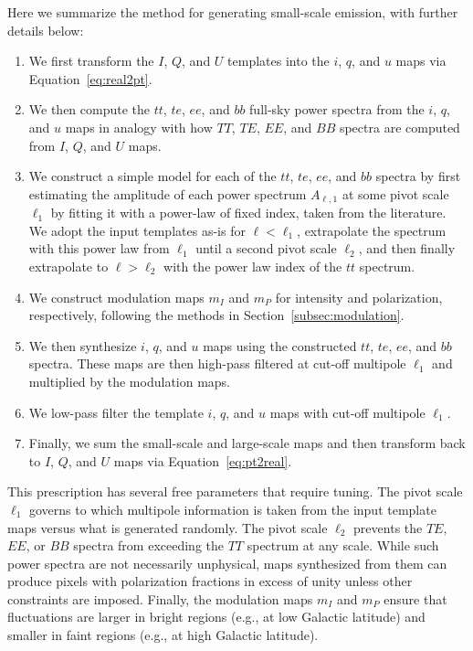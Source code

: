 Here we summarize the method for generating small-scale emission, with further details below: 
\begin{enumerate}
    \item We first transform the $I$, $Q$, and $U$ templates into the $i$, $q$, and $u$ maps via Equation~\eqref{eq:real2pt}. 
    \item We then compute the $tt$, $te$, $ee$, and $bb$ full-sky power spectra from the $i$, $q$, and $u$ maps in analogy with how $TT$, $TE$, $EE$, and $BB$ spectra are computed from $I$, $Q$, and $U$ maps.
    \item We construct a simple model for each of the $tt$, $te$, $ee$, and $bb$ spectra by first estimating the amplitude of each power spectrum $A_{\ell, 1}$ at some pivot scale $\ell_1$ by fitting it with a power-law of fixed index, taken from the literature. We adopt the input templates as-is for $\ell < \ell_1$, extrapolate the spectrum with this power law from $\ell_1$ until a second pivot scale $\ell_2$, and then finally extrapolate to $\ell > \ell_2$ with the power law index of the $tt$ spectrum.
    \item We construct modulation maps $m_I$ and $m_P$ for intensity and polarization, respectively, following the methods in Section~\ref{subsec:modulation}.
    \item We then synthesize $i$, $q$, and $u$ maps using the constructed $tt$, $te$, $ee$, and $bb$ spectra. These maps are then high-pass filtered at cut-off multipole $\ell_1$ and multiplied by the modulation maps. 
    \item We low-pass filter the template $i$, $q$, and $u$ maps with cut-off multipole $\ell_1$. 
    \item Finally, we sum the small-scale and large-scale maps and then transform back to $I$, $Q$, and $U$ maps via Equation~\eqref{eq:pt2real}. 
\end{enumerate}

This prescription has several free parameters that require tuning. The pivot scale $\ell_1$ governs to which multipole information is taken from the input template maps versus what is generated randomly. The pivot scale $\ell_2$ prevents the $TE$, $EE$, or $BB$ spectra from exceeding the $TT$ spectrum at any scale. While such power spectra are not necessarily unphysical, maps synthesized from them can produce pixels with polarization fractions in excess of unity unless other constraints are imposed. Finally, the modulation maps $m_I$ and $m_P$ ensure that fluctuations are larger in bright regions (e.g., at low Galactic latitude) and smaller in faint regions (e.g., at high Galactic latitude).

